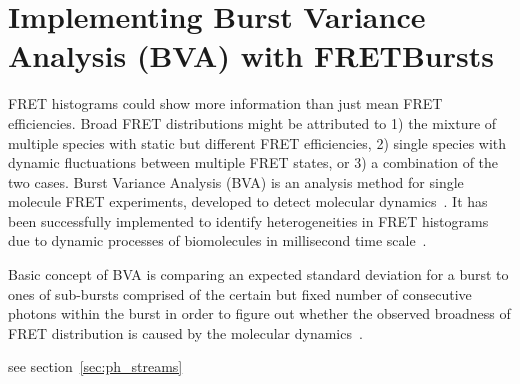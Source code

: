 \section{Implementing Burst Variance Analysis (BVA) with FRETBursts}

FRET histograms could show more information than just mean FRET efficiencies. Broad FRET distributions might be attributed to 1) the mixture of multiple species with static but different FRET efficiencies, 2) single species with dynamic fluctuations between multiple FRET states, or 3) a combination of the two cases. Burst Variance Analysis (BVA) is an analysis method for single molecule FRET experiments, developed to detect molecular dynamics~\cite{Torella_2011}. It has been successfully implemented to identify heterogeneities in FRET histograms due to dynamic processes of biomolecules in millisecond time scale~\cite{Torella_2011, Robb_2013}.

Basic concept of BVA is comparing an expected standard deviation for a burst to ones of sub-bursts comprised of the certain but fixed number of consecutive photons within the burst in order to figure out whether the observed broadness of FRET distribution is caused by the molecular dynamics~\cite{Torella_2011}. 

see section~\ref{sec:ph_streams}